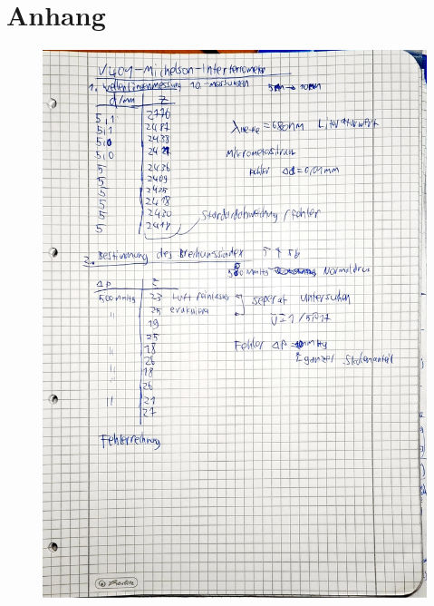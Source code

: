 \section{Anhang}

\begin{figure}
    \centering
    \includegraphics[width=\textwidth]{content/Anhang1.pdf}
\end{figure}